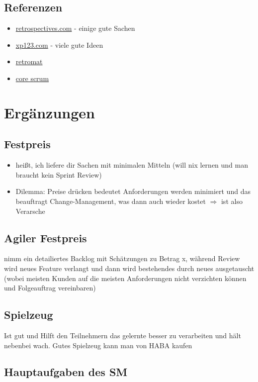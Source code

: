 \subsection{Referenzen}
\begin{itemize}
  \item \href{http://retrospectives.com/}{retrospectives.com} - einige gute Sachen
  \item
    \href{http://xp123.com/articles/patterns-for-iteration-retrospectives/}{xp123.com} - viele
    gute Ideen
  \item \href{http://plans-for-retrospectives.com}{retromat}
  \item \href{https://www.scrumalliance.org/why-scrum/core-scrum-values-roles}{core scrum}
\end{itemize}
\pagebreak


\section{Ergänzungen}
\subsection{Festpreis}
\begin{itemize}
  \item heißt, ich liefere dir Sachen mit minimalen Mitteln (will nix lernen und man braucht kein Sprint Review)
  \item Dilemma: Preise drücken bedeutet Anforderungen werden minimiert und das beauftragt
    Change-Management, was dann auch wieder kostet $\Rightarrow$ ist also Verarsche
\end{itemize}


\subsection{Agiler Festpreis}
nimm ein detailiertes Backlog mit Schätzungen zu Betrag x, während Review wird neues Feature
verlangt und dann wird bestehendes durch neues ausgetauscht (wobei meisten Kunden auf die
meisten Anforderungen nicht verzichten können und Folgeauftrag vereinbaren)


\subsection{Spielzeug}
Ist gut und Hilft den Teilnehmern das gelernte besser zu verarbeiten und hält nebenbei wach.
Gutes Spielzeug kann man von HABA kaufen


\subsection{Hauptaufgaben des SM}

